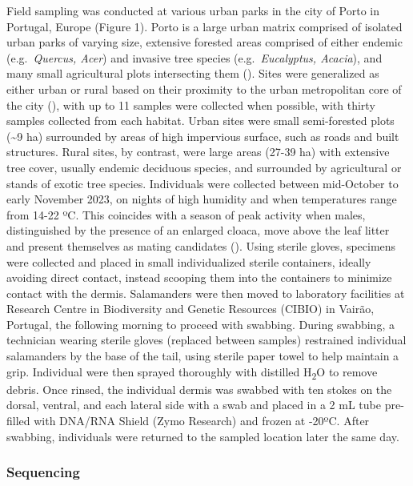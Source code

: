 \documentclass[
  12pt,
]{article}
\begin{document}
Field sampling was conducted at various urban parks in the city of Porto
in Portugal, Europe (Figure 1). Porto is a large urban matrix comprised
of isolated urban parks of varying size, extensive forested areas
comprised of either endemic (e.g.~\emph{Quercus, Acer}) and invasive
tree species (e.g.~\emph{Eucalyptus, Acacia}), and many small
agricultural plots intersecting them
(). Sites
were generalized as either urban or rural based on their proximity to
the urban metropolitan core of the city
(), with up to
11 samples were collected when possible, with thirty samples collected
from each habitat. Urban sites were small semi-forested plots
(\textasciitilde9 ha) surrounded by areas of high impervious surface,
such as roads and built structures. Rural sites, by contrast, were large
areas (27-39 ha) with extensive tree cover, usually endemic deciduous
species, and surrounded by agricultural or stands of exotic tree
species. Individuals were collected between mid-October to early
November 2023, on nights of high humidity and when temperatures range
from 14-22 ºC. This coincides with a season of peak activity when males,
distinguished by the presence of an enlarged cloaca, move above the leaf
litter and present themselves as mating candidates
(). Using sterile gloves, specimens were collected and placed in
small individualized sterile containers, ideally avoiding direct
contact, instead scooping them into the containers to minimize contact
with the dermis. Salamanders were then moved to laboratory facilities at
Research Centre in Biodiversity and Genetic Resources (CIBIO) in Vairão,
Portugal, the following morning to proceed with swabbing. During
swabbing, a technician wearing sterile gloves (replaced between samples)
restrained individual salamanders by the base of the tail, using sterile
paper towel to help maintain a grip. Individual were then sprayed
thoroughly with distilled H\textsubscript{2}O to remove debris. Once
rinsed, the individual dermis was swabbed with ten stokes on the dorsal,
ventral, and each lateral side with a swab and placed in a 2 mL tube
pre-filled with DNA/RNA Shield (Zymo Research) and frozen at -20ºC.
After swabbing, individuals were returned to the sampled location later
the same day.

\subsubsection{Sequencing}\label{sequencing}
\end{document}
